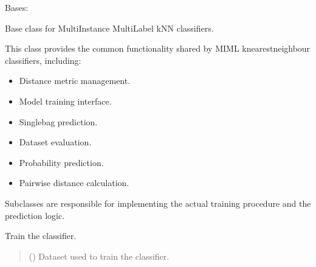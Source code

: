 \documentclass[letterpaper,10pt,english]{sphinxmanual}
\begin{document}
\begin{fulllineitems}
\label{\detokenize{classifier/lazy/index:miml.classifier.miml.lazy.multi_instance_multi_label_knn.MultiInstanceMultiLabelKNN}}
\pysigstartsignatures
\pysiglinewithargsret
{}
{}
{}
\pysigstopsignatures
\sphinxAtStartPar
Bases: 

\sphinxAtStartPar
Base class for Multi\sphinxhyphen{}Instance Multi\sphinxhyphen{}Label kNN classifiers.

\sphinxAtStartPar
This class provides the common functionality shared by MIML
k\sphinxhyphen{}nearest\sphinxhyphen{}neighbour classifiers, including:
\begin{itemize}
\item {} 
\sphinxAtStartPar
Distance metric management.

\item {} 
\sphinxAtStartPar
Model training interface.

\item {} 
\sphinxAtStartPar
Single\sphinxhyphen{}bag prediction.

\item {} 
\sphinxAtStartPar
Dataset evaluation.

\item {} 
\sphinxAtStartPar
Probability prediction.

\item {} 
\sphinxAtStartPar
Pairwise distance calculation.

\end{itemize}

\sphinxAtStartPar
Subclasses are responsible for implementing the actual training
procedure and the prediction logic.

\begin{fulllineitems}
\label{\detokenize{classifier/lazy/index:miml.classifier.miml.lazy.multi_instance_multi_label_knn.MultiInstanceMultiLabelKNN.build}}
\pysigstartsignatures
\pysiglinewithargsret
{}
{}
{}
\pysigstopsignatures
\sphinxAtStartPar
Train the classifier.
\begin{quote}\begin{description}
\sphinxAtStartPar
{} () \textendash{} Dataset used to train the classifier.


\end{description}
\end{quote}
\end{fulllineitems}
\end{fulllineitems}
\end{document}

